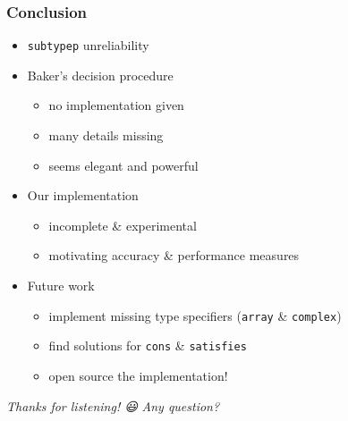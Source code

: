 \documentclass[aspectratio=169]{beamer}
\renewcommand\code[1]{\texttt{#1}}
\newcommand\emoji[2][\tiny]{{#1#2}}
\begin{document}
\begin{frame}[standout]
  \frametitle{Conclusion}
  \begin{itemize}
  \item \code{subtypep} unreliability
  \item Baker's decision procedure
    \begin{itemize}
    \item no implementation given
    \item many details missing
    \item seems elegant and powerful
    \end{itemize}
  \item Our implementation
    \begin{itemize}
    \item incomplete \& experimental
    \item motivating accuracy \& performance measures
    \end{itemize}
  \item Future work
    \begin{itemize}
    \item implement missing type specifiers (\code{array} \& \code{complex})
    \item find solutions for \code{cons} \& \code{satisfies}
    \item open source the implementation!
    \end{itemize}
  \end{itemize}
\end{frame}

\begin{sectionframe}{\it Thanks for listening! \emoji[\normalsize]{😃}}
  \it Any question?
\end{sectionframe}

%   
%   
\end{document}
